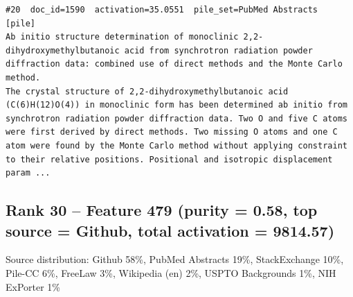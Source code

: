\begin{verbatim}
#20  doc_id=1590  activation=35.0551  pile_set=PubMed Abstracts  [pile]
Ab initio structure determination of monoclinic 2,2-dihydroxymethylbutanoic acid from synchrotron radiation powder diffraction data: combined use of direct methods and the Monte Carlo method.
The crystal structure of 2,2-dihydroxymethylbutanoic acid (C(6)H(12)O(4)) in monoclinic form has been determined ab initio from synchrotron radiation powder diffraction data. Two O and five C atoms were first derived by direct methods. Two missing O atoms and one C atom were found by the Monte Carlo method without applying constraint to their relative positions. Positional and isotropic displacement param ...

\end{verbatim}

\subsection*{Rank 30 -- Feature 479 (purity = 0.58, top source = Github, total activation = 9814.57)}

Source distribution: Github 58\%, PubMed Abstracts 19\%, StackExchange 10\%, Pile-CC 6\%, FreeLaw 3\%, Wikipedia (en) 2\%, USPTO Backgrounds 1\%, NIH ExPorter 1\%

